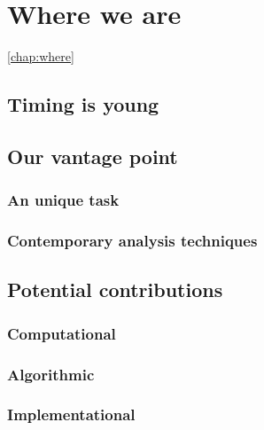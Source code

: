 \chapter{Where we are}
\ref{chap:where}

\section{Timing is young}

\section{Our vantage point}
    \subsection{An unique task}
    \subsection{Contemporary analysis techniques}

\section{Potential contributions}
    \subsection{Computational}
    \subsection{Algorithmic}
    \subsection{Implementational}
        